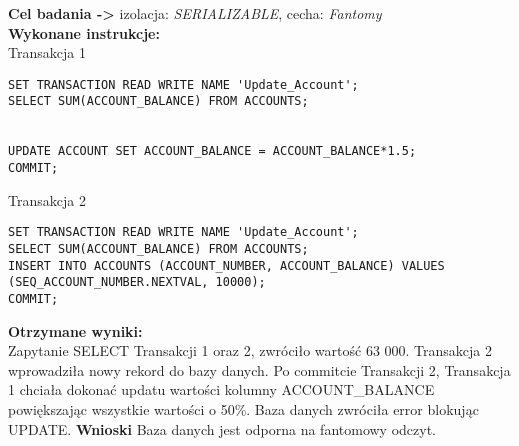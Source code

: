 \documentclass[11pt,oneside, a4paper]{article}
\begin{document}
\textbf{Cel badania ->} izolacja:
\textit{SERIALIZABLE}, cecha:
\textit{Fantomy} \\
\textbf{Wykonane instrukcje: } \\
Transakcja 1
\begin{lstlisting}
SET TRANSACTION READ WRITE NAME 'Update_Account';
SELECT SUM(ACCOUNT_BALANCE) FROM ACCOUNTS;


UPDATE ACCOUNT SET ACCOUNT_BALANCE = ACCOUNT_BALANCE*1.5;
COMMIT;
\end{lstlisting}
Transakcja 2
\begin{lstlisting}
SET TRANSACTION READ WRITE NAME 'Update_Account';
SELECT SUM(ACCOUNT_BALANCE) FROM ACCOUNTS;
INSERT INTO ACCOUNTS (ACCOUNT_NUMBER, ACCOUNT_BALANCE) VALUES (SEQ_ACCOUNT_NUMBER.NEXTVAL, 10000);
COMMIT;
\end{lstlisting}
\textbf{Otrzymane wyniki:} \\
    Zapytanie SELECT Transakcji 1 oraz 2, zwróciło  wartość 63 000. Transakcja 2 wprowadziła nowy rekord do bazy danych. Po commitcie Transakcji 2, Transakcja 1 chciała dokonać updatu wartości kolumny ACCOUNT\_BALANCE powiększając wszystkie wartości o 50\%. Baza danych zwróciła error blokując UPDATE.
\textbf{Wnioski } Baza danych jest odporna na fantomowy odczyt.
\end{document}
